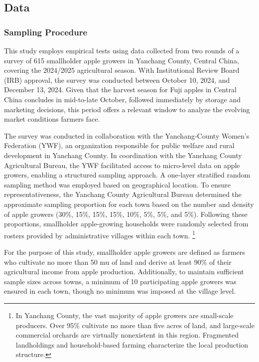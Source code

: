 \documentclass[12pt]{article}
\begin{document}
\subsection{Data}
\subsubsection{Sampling Procedure}
\noindent This study employs empirical tests using data collected from two rounds of a survey of 615 smallholder apple growers in Yanchang County, Central China, covering the 2024/2025 agricultural season. With Institutional Review Board (IRB) approval, the survey was conducted between October 10, 2024, and December 13, 2024. Given that the harvest season for Fuji apples in Central China concludes in mid-to-late October, followed immediately by storage and marketing decisions, this period offers a relevant window to analyze the evolving market conditions farmers face.

The survey was conducted in collaboration with the Yanchang-County Women's Federation (YWF), an organization responsible for public welfare and rural development in Yanchang County. In coordination with the Yanchang County Agricultural Bureau, the YWF facilitated access to micro-level data on apple growers, enabling a structured sampling approach. A one-layer stratified random sampling method was employed based on geographical location. To ensure representativeness, the Yanchang County Agricultural Bureau determined the approximate sampling proportion for each town based on the number and density of apple growers (30\%, 15\%, 15\%, 15\%, 10\%, 5\%, 5\%, and 5\%). Following these proportions, smallholder apple-growing households were randomly selected from rosters provided by administrative villages within each town. \footnote{In Yanchang County, the vast majority of apple growers are small-scale producers. Over 95\% cultivate no more than five acres of land, and large-scale commercial orchards are virtually nonexistent in this region. Fragmented landholdings and household-based farming characterize the local production structure.}

For the purpose of this study, smallholder apple growers are defined as farmers who cultivate no more than 50 mu of land and derive at least 90\% of their agricultural income from apple production. Additionally, to maintain sufficient sample sizes across towns, a minimum of 10 participating apple growers was ensured in each town, though no minimum was imposed at the village level.
\end{document}
